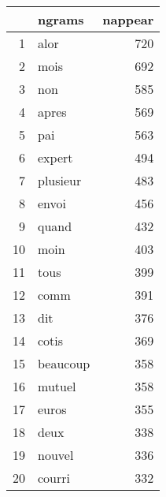 \begin{tabular}{|r|l|r|}
  \hline
 & ngrams & nappear \\ 
  \hline
1 & alor & 720 \\ 
  2 & mois & 692 \\ 
  3 & non & 585 \\ 
  4 & apres & 569 \\ 
  5 & pai & 563 \\ 
  6 & expert & 494 \\ 
  7 & plusieur & 483 \\ 
  8 & envoi & 456 \\ 
  9 & quand & 432 \\ 
  10 & moin & 403 \\ 
  11 & tous & 399 \\ 
  12 & comm & 391 \\ 
  13 & dit & 376 \\ 
  14 & cotis & 369 \\ 
  15 & beaucoup & 358 \\ 
  16 & mutuel & 358 \\ 
  17 & euros & 355 \\ 
  18 & deux & 338 \\ 
  19 & nouvel & 336 \\ 
  20 & courri & 332 \\ 
   \hline
\end{tabular}
